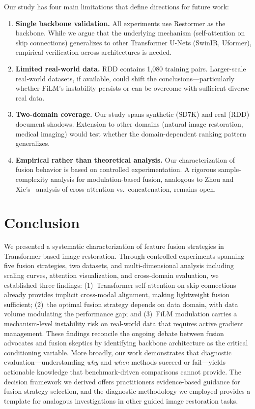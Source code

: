 \documentclass[pdflatex,sn-basic,Numbered]{sn-jnl}
\theoremstyle{thmstyleone}
\theoremstyle{thmstyletwo}
\theoremstyle{thmstylethree}
\begin{document}
Our study has four main limitations that define directions for future work:

\begin{enumerate}
  \item \textbf{Single backbone validation.} All experiments use Restormer as the backbone. While we argue that the underlying mechanism (self-attention on skip connections) generalizes to other Transformer U-Nets (SwinIR, Uformer), empirical verification across architectures is needed.
  \item \textbf{Limited real-world data.} RDD contains 1,080 training pairs. Larger-scale real-world datasets, if available, could shift the conclusions---particularly whether FiLM's instability persists or can be overcome with sufficient diverse real data.
  \item \textbf{Two-domain coverage.} Our study spans synthetic (SD7K) and real (RDD) document shadows. Extension to other domains (natural image restoration, medical imaging) would test whether the domain-dependent ranking pattern generalizes.
  \item \textbf{Empirical rather than theoretical analysis.} Our characterization of fusion behavior is based on controlled experimentation. A rigorous sample-complexity analysis for modulation-based fusion, analogous to Zhou and Xie's~\cite{zhou2026feature} analysis of cross-attention vs.\ concatenation, remains open.
\end{enumerate}

\section{Conclusion}\label{sec:conclusion}

We presented a systematic characterization of feature fusion strategies in Transformer-based image restoration.
Through controlled experiments spanning five fusion strategies, two datasets, and multi-dimensional analysis including scaling curves, attention visualization, and cross-domain evaluation, we established three findings: (1)~Transformer self-attention on skip connections already provides implicit cross-modal alignment, making lightweight fusion sufficient; (2)~the optimal fusion strategy depends on data domain, with data volume modulating the performance gap; and (3)~FiLM modulation carries a mechanism-level instability risk on real-world data that requires active gradient management.
These findings reconcile the ongoing debate between fusion advocates and fusion skeptics by identifying backbone architecture as the critical conditioning variable.
More broadly, our work demonstrates that diagnostic evaluation---understanding \textit{why} and \textit{when} methods succeed or fail---yields actionable knowledge that benchmark-driven comparisons cannot provide.
The decision framework we derived offers practitioners evidence-based guidance for fusion strategy selection, and the diagnostic methodology we employed provides a template for analogous investigations in other guided image restoration tasks.
\end{document}
